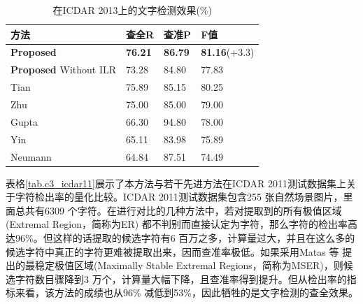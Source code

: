         \begin{table}[!h]
        \centering
        \caption{在ICDAR 2013上的文字检测效果(\%)}
        \begin{tabular}{p{} p{} p{} p{}}
        \toprule
        方法 & 查全R & 查准P & F值 \\
        \midrule
        \textbf{Proposed} & \textbf{76.21} & \textbf{86.79} & \textbf{81.16}(+3.3) \\
        \textbf{Proposed} Without ILR & 73.28 & 84.80 & 77.83 \\
        Tian\cite{Tian2016Text} & 75.89 & 85.15 & 80.25 \\
        Zhu\cite{Zhu2016Text} & 75.00 & 85.00 & 79.00 \\
        Gupta\cite{Gupta2016Synthetic} & 66.30 & 94.80 & 78.00 \\
        Yin\cite{Yin2013Robust} & 65.11 & 83.98 & 75.89 \\
        Neumann\cite{Neumann2012Real} & 64.84 & 87.51 & 74.49 \\
        \bottomrule
        \end{tabular}
        \label{tab.c3_icdar13}
        \end{table}

        表格\ref{tab.c3_icdar11}展示了本方法与若干先进方法在ICDAR 2011测试数据集上关于字符检出率的量化比较。ICDAR 2011测试数据集包含255 张自然场景图片，里面总共有6309 个字符。在进行对比的几种方法中，若对提取到的所有极值区域(Extremal Region，简称为ER) 都不判别而直接认定为字符，那么字符的检出率高达96\%。但这样的话提取的候选字符有6 百万之多，计算量过大，并且在这么多的候选字符中真正的字符更难被提取出来，因而查准率极低。如果采用Matas 等\cite{Matas2004Robust} 提出的最稳定极值区域(Maximally Stable Extremal Regions，简称为MSER)，则候选字符数目骤降到3 万个，计算量大幅下降，且查准率得到提升。但从检出率的指标来看，该方法的成绩也从96\% 减低到53\%，因此牺牲的是文字检测的查全效果。

